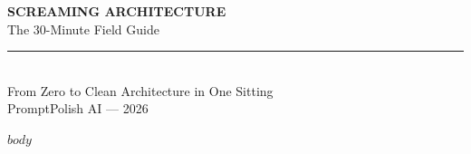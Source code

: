 \documentclass[11pt,a4paper]{article}
\begin{document}
\begin{center}
\vspace*{2cm}
{\Huge\bfseries\color{primary} SCREAMING ARCHITECTURE}\\[0.8cm]
{\Large\color{accent} The 30-Minute Field Guide}\\[0.5cm]
\rule{0.6\textwidth}{0.5pt}\\[0.5cm]
{\large From Zero to Clean Architecture in One Sitting}\\[2cm]
{\small \color{gray} PromptPolish AI — 2026}
\end{center}

\newpage

$body$
\end{document}
